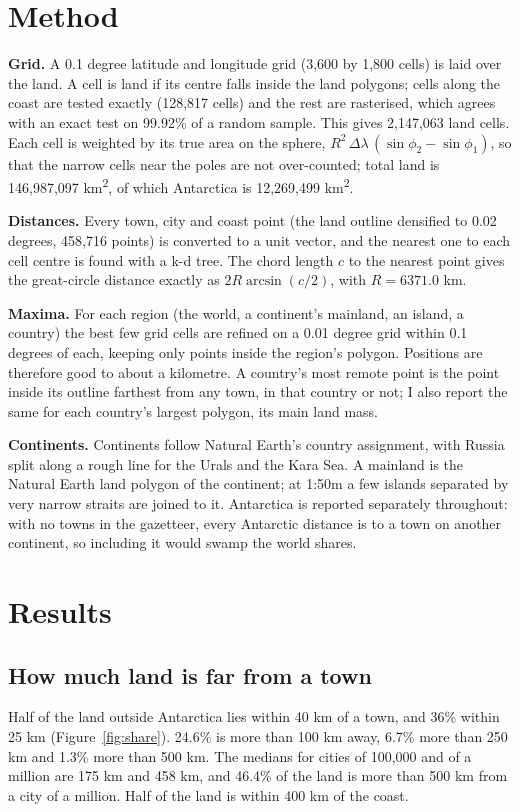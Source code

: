 \documentclass[11pt,a4paper]{article}
\begin{document}
\section{Method}
\textbf{Grid.} A 0.1 degree latitude and longitude grid (3,600 by 1,800 cells) is laid over the land. A cell is land if its centre falls inside the land polygons; cells along the coast are tested exactly (128,817 cells) and the rest are rasterised, which agrees with an exact test on 99.92\% of a random sample. This gives 2,147,063 land cells. Each cell is weighted by its true area on the sphere, $R^2\,\Delta\lambda\,(\sin\phi_2-\sin\phi_1)$, so that the narrow cells near the poles are not over-counted; total land is 146,987,097 km\textsuperscript{2}, of which Antarctica is 12,269,499 km\textsuperscript{2}.

\textbf{Distances.} Every town, city and coast point (the land outline densified to 0.02 degrees, 458,716 points) is converted to a unit vector, and the nearest one to each cell centre is found with a k-d tree. The chord length $c$ to the nearest point gives the great-circle distance exactly as $2R\arcsin(c/2)$, with $R = 6371.0$ km.

\textbf{Maxima.} For each region (the world, a continent's mainland, an island, a country) the best few grid cells are refined on a 0.01 degree grid within 0.1 degrees of each, keeping only points inside the region's polygon. Positions are therefore good to about a kilometre. A country's most remote point is the point inside its outline farthest from any town, in that country or not; I also report the same for each country's largest polygon, its main land mass.

\textbf{Continents.} Continents follow Natural Earth's country assignment, with Russia split along a rough line for the Urals and the Kara Sea. A mainland is the Natural Earth land polygon of the continent; at 1:50m a few islands separated by very narrow straits are joined to it. Antarctica is reported separately throughout: with no towns in the gazetteer, every Antarctic distance is to a town on another continent, so including it would swamp the world shares.

\section{Results}
\subsection{How much land is far from a town}
Half of the land outside Antarctica lies within 40 km of a town, and 36\% within 25 km (Figure~\ref{fig:share}). 24.6\% is more than 100 km away, 6.7\% more than 250 km and 1.3\% more than 500 km. The medians for cities of 100,000 and of a million are 175 km and 458 km, and 46.4\% of the land is more than 500 km from a city of a million. Half of the land is within 400 km of the coast.
\end{document}
